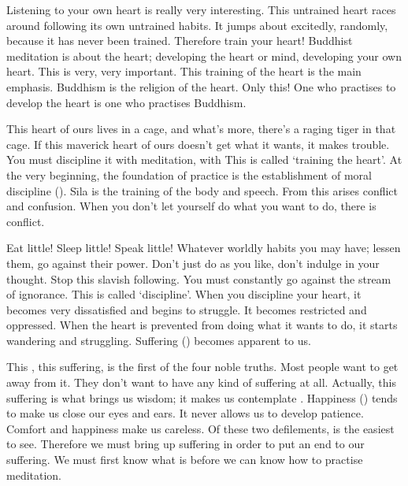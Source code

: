 Listening to your own heart is really very interesting. This untrained heart races around following its own untrained habits. It jumps about excitedly, randomly, because it has never been trained. Therefore train your heart! Buddhist meditation is about the heart; developing the heart or mind, developing your own heart. This is very, very important. This training of the heart is the main emphasis. Buddhism is the religion of the heart. Only this! One who practises to develop the heart is one who practises Buddhism.

This heart of ours lives in a cage, and what's more, there's a raging tiger in that cage. If this maverick heart of ours doesn't get what it wants, it makes trouble. You must discipline it with meditation, with  This is called `training the heart'. At the very beginning, the foundation of practice is the establishment of moral discipline (). S\={\i}la is the training of the body and speech. From this arises conflict and confusion. When you don't let yourself do what you want to do, there is conflict.

Eat little! Sleep little! Speak little! Whatever worldly habits you may have; lessen them, go against their power. Don't just do as you like, don't indulge in your thought. Stop this slavish following. You must constantly go against the stream of ignorance. This is called `discipline'. When you discipline your heart, it becomes very dissatisfied and begins to struggle. It becomes restricted and oppressed. When the heart is prevented from doing what it wants to do, it starts wandering and struggling. Suffering () becomes apparent to us.

This , this suffering, is the first of the four noble truths. Most people want to get away from it. They don't want to have any kind of suffering at all. Actually, this suffering is what brings us wisdom; it makes us contemplate . Happiness () tends to make us close our eyes and ears. It never allows us to develop patience. Comfort and happiness make us careless. Of these two defilements,  is the easiest to see. Therefore we must bring up suffering in order to put an end to our suffering. We must first know what  is before we can know how to practise meditation.

